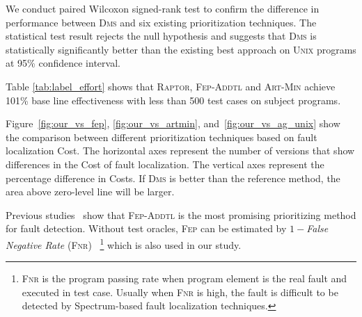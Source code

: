 We conduct paired Wilcoxon signed-rank test to confirm the difference in performance between \textsc{Dms} and six existing prioritization techniques.
The statistical test result rejects the null hypothesis and suggests that \textsc{Dms} is statistically significantly
better than the existing best approach on \textsc{Unix} programs at 95\% confidence interval.

\vspace{0.2cm}
 Table \ref{tab:label_effort} shows that \textsc{Raptor}, \textsc{Fep-Addtl} and \textsc{Art-Min} achieve 101\% base line effectiveness with less than 500 test cases on subject programs.


Figure~\ref{fig:our_vs_fep}, \ref{fig:our_vs_artmin}, and~\ref{fig:our_vs_ag_unix}
show the comparison between different
prioritization techniques based on fault localization Cost.
The horizontal axes represent the number of versions that
show differences in the Cost of
fault localization. The vertical axes represent the percentage
difference in Costs. If \textsc{Dms} is better than the reference
method, the area above zero-level line will be larger.

\vspace{0.2cm}
Previous studies~\citep{RUCH01,SEAGMGR01} show that \textsc{Fep-Addtl} is the most
promising prioritizing method for fault detection.
Without test oracles, \textsc{Fep} can be estimated by $1 - ${\em False Negative Rate} (\textsc{Fnr})~\citep{Gonzalez-SanchezPAGG11}
\footnote{\textsc{Fnr} is the program passing rate when program element is the real fault and executed in test case. Usually when
\textsc{Fnr} is high, the fault is difficult to be detected by Spectrum-based
fault localization techniques.} which is also used in our study.



